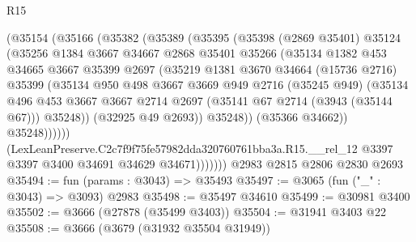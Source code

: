 \begin{lexlean}{R15}
\begin{coremodule}
                  (@35154
                    (@35166
                      (@35382
                        (@35389
                          (@35395
                            (@35398
                              (@2869 @35401)
                              @35124
                              (@35256
                                @1384
                                @3667
                                @34667
                                @2868
                                @35401
                                @35266
                                (@35134
                                  @1382
                                  @453
                                  @34665
                                  @3667
                                  @35399
                                  @2697
                                  (@35219
                                    @1381
                                    @3670
                                    @34664
                                    (@15736 @2716)
                                    @35399
                                    (@35134
                                      @950
                                      @498
                                      @3667
                                      @3669
                                      @949
                                      @2716
                                      (@35245 @949)
                                      (@35134
                                        @496
                                        @453
                                        @3667
                                        @3667
                                        @2714
                                        @2697
                                        (@35141 @67 @2714 (@3943 (@35144 @67)))
                                        @35248))
                                    (@32925 @49 @2693))
                                  @35248))
                              (@35366 @34662))
                            @35248))))))
                (LexLeanPreserve.C2c7f9f75fe57982dda320760761bba3a.R15.__rel_12
                  @3397
                  @3397
                  @3400
                  @34691
                  @34629
                  @34671)))))))
    @2983
    @2815
    @2806
    @2830
    @2693
@35494 := fun (params : @3043) => @35493
@35497 := @3065 (fun ("_" : @3043) => @3093) @2983
@35498 := @35497 @34610
@35499 := @30981 @3400
@35502 := @3666 (@27878 (@35499 @3403))
@35504 := @31941 @3403 @22
@35508 := @3666 (@3679 (@31932 @35504 @31949))

\end{coremodule}
\end{lexlean}
